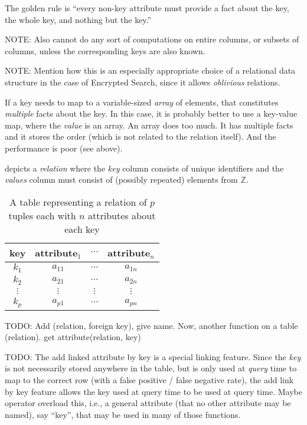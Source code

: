 \documentclass[ ../main.tex]{subfiles}
\begin{document}
The golden rule is ``every non-key attribute must provide a fact about the key, the whole key, and nothing but the key.''

NOTE: Also cannot do any sort of computations on entire columns, or subsets of columns, unless the corresponding keys are also known.

NOTE: Mention how this is an especially appropriate choice of a relational data structure in the case of Encrypted Search, since it allows \emph{oblivious} relations.

If a key needs to map to a variable-sized \emph{array} of elements, that constitutes \emph{multiple} facts about the key. In this case, it is probably better to use a key-value map, where the \emph{value} is an array. An array does too much. It has multiple facts and it stores the order (which is not related to the relation itself). And the performance is poor (see above).

 depicts a \emph{relation} where the \emph{key} column consists of unique identifiers and the \emph{values} column must consist of (possibly repeated) elements from $\mathbb{Z}$.
\begin{table}[h]
\centering
\caption{A table representing a relation of $p$ tuples each with $n$ attributes about each key}
\label{tbl:relation}
\begin{tabular}{|c c c c|} 
\hline
key & attribute$_1$ & $\cdots$ & attribute$_n$\\
\hline
    $k_1$ & $a_{1 1}$ & $\cdots$ & $a_{1 n}$\\
    $k_2$ & $a_{2 1}$ & $\cdots$ & $a_{2 n}$\\
    $\vdots$ & $\vdots$& $\vdots$ & $\vdots$\\
    $k_p$ & $a_{p 1}$ & $\cdots$ & $a_{p n}$\\
\hline
\end{tabular}
\end{table}


TODO: Add (relation, foreign key), give name. Now, another function on a table (relation). get attribute(relation, key)

TODO: The add linked attribute by key is a special linking feature. Since the \emph{key} is not necessarily stored anywhere in the table, but is only used at \emph{query} time to map to the correct row (with a false positive / false negative rate), the add link by key feature allows the key used at query time to be used at query time. Maybe operator overload this, i.e., a general attribute (that no other attribute may be named), say ``key'', that may be used in many of those functions.
\end{document}
